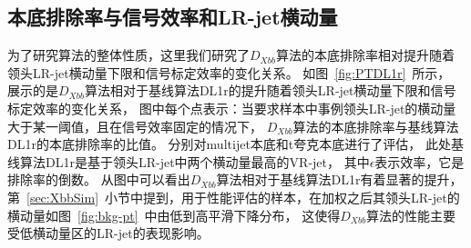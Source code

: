 \subsection{本底排除率与信号效率和LR-jet横动量}
\label{sec:XbbPerf6}

为了研究算法的整体性质，这里我们研究了$D_{Xbb}$算法的本底排除率相对提升随着领头LR-jet横动量下限和信号标定效率的变化关系。
如图~\ref{fig:PTDL1r}~所示，
展示的是$D_{Xbb}$算法相对于基线算法DL1r的提升随着领头LR-jet横动量下限和信号标定效率的变化关系，
图中每个点表示：当要求样本中事例领头LR-jet的横动量大于某一阈值，且在信号效率固定的情况下，
$D_{Xbb}$算法的本底排除率与基线算法DL1r的本底排除率的比值。
分别对multijet本底和t夸克本底进行了评估，
此处基线算法DL1r是基于领头LR-jet中两个横动量最高的VR-jet，
其中$\epsilon$表示效率，它是排除率的倒数。
从图中可以看出$D_{Xbb}$算法相对于基线算法DL1r有着显著的提升，
第~\ref{sec:XbbSim}~小节中提到，用于性能评估的样本，在加权之后其领头LR-jet的横动量如图~\ref{fig:bkg-pt}~中由低到高平滑下降分布，
这使得$D_{Xbb}$算法的性能主要受低横动量区的LR-jet的表现影响。


